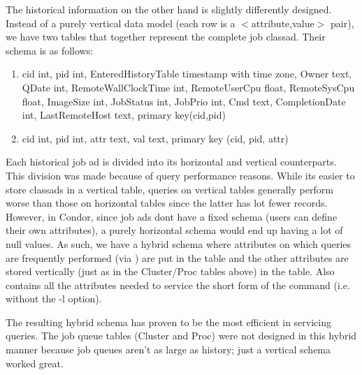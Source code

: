 The historical information on the other hand is slightly differently
designed.  Instead of a purely vertical data model (each row is a
$<$attribute,value$>$ pair), we have two tables that together represent the
complete job classad.  Their schema is as follows:

\begin{enumerate}

\item {}
        {cid                  int,
        pid                  int,
	EnteredHistoryTable  timestamp with time zone,
        Owner                text,
        QDate                int,
        RemoteWallClockTime  int,
        RemoteUserCpu        float,
        RemoteSysCpu         float,
        ImageSize            int,
        JobStatus            int,
        JobPrio              int,
        Cmd                  text,
        CompletionDate       int,
        LastRemoteHost       text,
        primary key(cid,pid)}

\item {}
	{cid int, pid int, attr text, val text, primary key
	(cid, pid, attr)}

\end{enumerate}

Each historical job ad is divided into its horizontal and vertical
counterparts.  This division was made because of query performance
reasons.  While its easier to store classads in a vertical table,
queries on vertical tables generally perform worse than those on
horizontal tables since the latter has lot fewer records.  However, in
Condor, since job ads dont have a fixed schema (users can define their
own attributes), a purely horizontal schema would end up having a lot
of null values. As such, we have a hybrid schema where attributes on
which queries are frequently performed (via ) are put
in the  table and the other attributes
are stored vertically (just as in the Cluster/Proc tables above) in the
 table. Also 
contains all the attributes needed to service the short form of the
 command (i.e. without the -l option).

The resulting hybrid schema has proven to be the most efficient in
servicing  queries.  The job queue tables (Cluster and
Proc) were not designed in this hybrid manner because job queues aren't
as large as history; just a vertical schema worked great.


